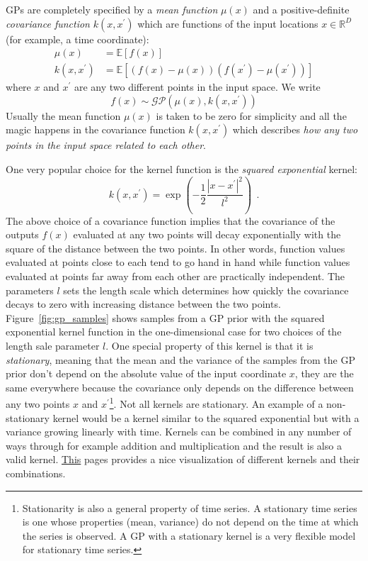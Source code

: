 \documentclass[12pt,dvipsnames]{report}
\newcommand{\hquad}{~~}
\begin{document}
GPs are completely specified by a \textsl{mean function} $\mu (x)$ and a
positive-definite \textsl{covariance function} $k(x,x^\prime)$ which are
functions of the input locations $x\in \mathbb{R}^D$ (for example, a time
coordinate):
\begin{align}
    \mu (x)        & =\mathbb{E}[f(x)]                                                    \\
    k(x, x^\prime) & =\mathbb{E}\left[(f(x) -\mu (x))(f(x^\prime) -\mu (x^\prime))\right]
\end{align}
where $x$ and $x^\prime$ are any two different points in the input space.
We write
\begin{equation}
    f(x) \sim \mathcal{G} \mathcal{P}\left(\mu(x), k\left(x, x^{\prime}\right)\right)
\end{equation}
Usually the mean function $\mu(x)$  is taken to be zero for simplicity and all the
magic happens in the covariance function $k(x,x^\prime)$ which describes
\emph{how  any two points in the input space related to each other}.

One very popular choice for the kernel function is the \textsl{squared
    exponential} kernel:
\begin{equation}
    k(x, x^\prime) = \exp\left(-\frac{1}{2}\frac{\left|x-x^\prime\right|^2}{l^2}\right)\hquad .
    \label{eq:sqexp}
\end{equation}
The above choice of a covariance function implies that the covariance of the outputs
$f(x)$ evaluated at any two points  will decay exponentially with the square of
the distance between the two points.
In other words, function values evaluated at points close to each tend to go hand in hand
while function values evaluated at points far away from each other are practically
independent.
The parameters $l$ sets the length scale which determines how quickly the covariance decays
to zero with increasing distance between the two points.
Figure~\ref{fig:gp_samples} shows samples from a GP prior with the squared exponential
kernel function in the one-dimensional case for two choices of the length sale parameter
$l$. One special property of this kernel is that it is \textsl{stationary}, meaning
that the mean and the variance of the samples from the GP prior don't depend on the
absolute value of the input coordinate $x$, they are the same everywhere because
the covariance only depends on the difference between any two points $x$ and
$x^\prime$\footnote{Stationarity is also a general property of time series.
    A stationary  time series is one whose properties (mean, variance) do not depend
    on the time at which the series is observed. A GP with a stationary kernel is a very flexible
    model for stationary time series.}. Not all kernels are stationary. An example of
a non-stationary kernel would be a kernel similar to the squared exponential but with
a variance growing linearly with time.
Kernels can be combined in any number of ways through for example addition and
multiplication and the result is also a valid kernel.
\href{https://www.cs.toronto.edu/~duvenaud/cookbook/}{This} pages provides a
nice visualization of different kernels and their combinations.
\end{document}
